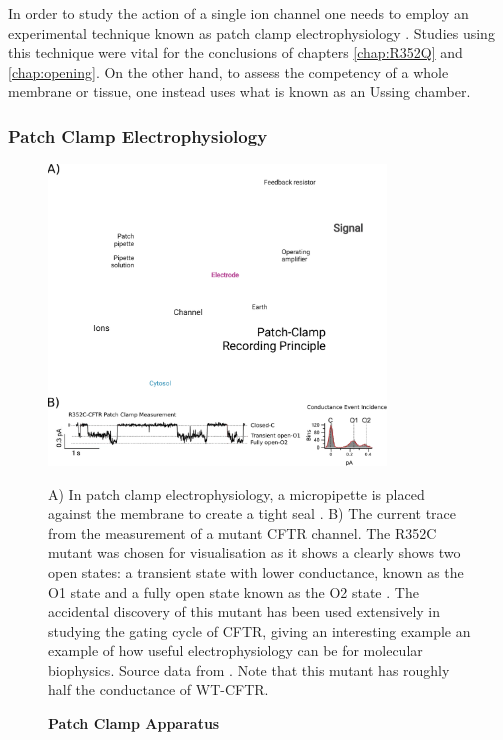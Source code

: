 In order to study the action of a single ion channel one needs to employ an experimental technique known as patch clamp electrophysiology \cite{hille2001}. Studies using this technique were vital for the conclusions of chapters \ref{chap:R352Q} and \ref{chap:opening}. On the other hand, to assess the competency of a whole membrane or tissue, one instead uses what is known as an Ussing chamber. 

\subsubsection{Patch Clamp Electrophysiology}
\begin{figure}
	\label{patch_clamp}
	\begin{center}
	\includegraphics[width=0.8\textwidth]{figures/R352C_ephys_measurement_figure.pdf}
	\end{center}
	\captionsetup{singlelinecheck = false, justification=raggedright}
	\caption[Patch Clamp Apparatus] {\textbf{Patch Clamp Apparatus}}{A) In patch clamp electrophysiology, a micropipette is placed against the membrane to create a tight seal \cite{patch_clamp_recording_principal_figure}. B) The current trace from the measurement of a mutant CFTR channel. The R352C mutant was chosen for visualisation as it shows a clearly shows two open states: a transient state with lower conductance, known as the O1 state and a fully open state known as the O2 state \cite{jih2012}. The accidental discovery of this mutant has been used extensively in studying the gating cycle of CFTR, giving an interesting example an example of how useful electrophysiology can be for molecular biophysics. Source data from \cite{jih2012}. Note that this mutant has roughly half the conductance of WT-CFTR.} 
\end{figure}

